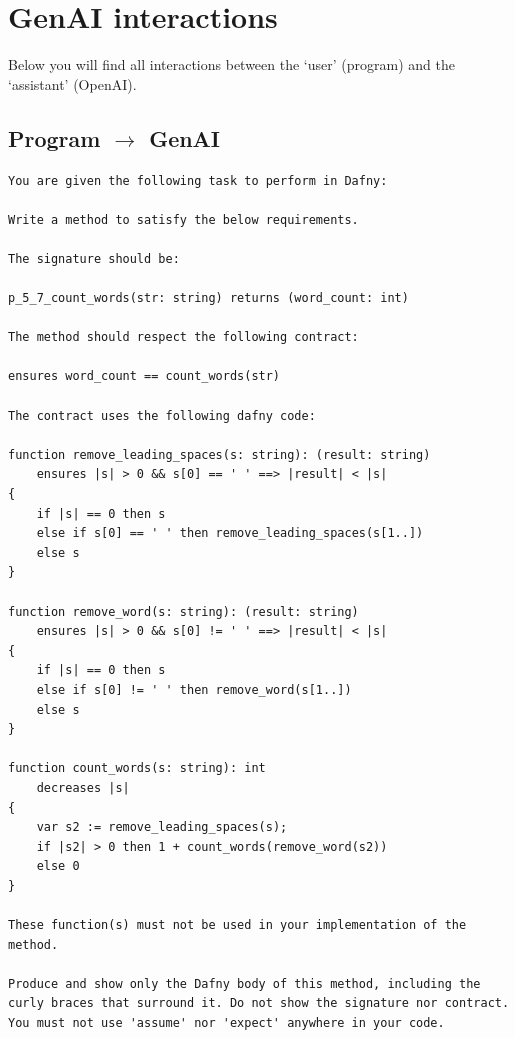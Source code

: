 \documentclass{article}
\begin{document}
\section*{GenAI interactions}
Below you will find all interactions between the `user' (program) and the `assistant' (OpenAI).
\subsection*{Program $\rightarrow$ GenAI}
\begin{lstlisting}
You are given the following task to perform in Dafny:

Write a method to satisfy the below requirements.

The signature should be:

p_5_7_count_words(str: string) returns (word_count: int)

The method should respect the following contract:

ensures word_count == count_words(str)

The contract uses the following dafny code:

function remove_leading_spaces(s: string): (result: string)
    ensures |s| > 0 && s[0] == ' ' ==> |result| < |s|
{
    if |s| == 0 then s
    else if s[0] == ' ' then remove_leading_spaces(s[1..])
    else s
}

function remove_word(s: string): (result: string)
    ensures |s| > 0 && s[0] != ' ' ==> |result| < |s|
{
    if |s| == 0 then s
    else if s[0] != ' ' then remove_word(s[1..])
    else s
}

function count_words(s: string): int
    decreases |s|
{
    var s2 := remove_leading_spaces(s);
    if |s2| > 0 then 1 + count_words(remove_word(s2))
    else 0
}

These function(s) must not be used in your implementation of the method.

Produce and show only the Dafny body of this method, including the curly braces that surround it. Do not show the signature nor contract. You must not use 'assume' nor 'expect' anywhere in your code.
\end{lstlisting}
\end{document}
